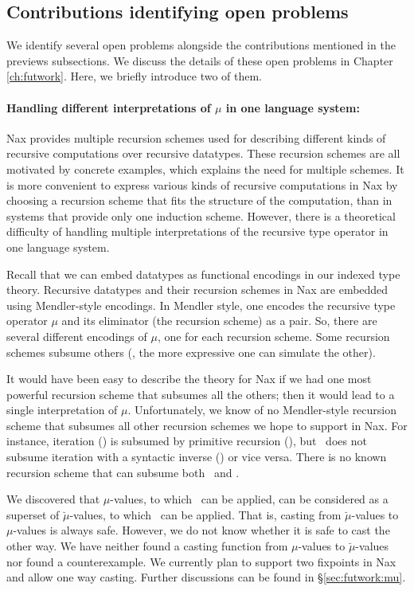 \subsection{Contributions identifying open problems}
We identify several open problems alongside the contributions mentioned
in the previews subsections. We discuss the details of these open problems
in Chapter \ref{ch:futwork}. Here, we briefly introduce two of them.

\paragraph{Handling different interpretations of $\mu$ in one language system:}
Nax provides multiple recursion schemes used for
describing different kinds of recursive computations over recursive datatypes.
These recursion schemes are all motivated by concrete examples, which explains
the need for multiple schemes. It is more convenient to express various kinds of
recursive computations in Nax by choosing a recursion scheme that fits
the structure of the computation, than in systems that provide
only one induction scheme. However, there is a theoretical difficulty
of handling multiple interpretations of the recursive type operator
in one language system.

Recall that we can embed datatypes as functional encodings in
our indexed type theory. Recursive datatypes and their recursion schemes in Nax
are embedded using Mendler-style encodings.
In Mendler style, one encodes the recursive type operator $\mu$
and its eliminator (the recursion scheme) as a pair.
So, there are several different encodings of $\mu$,
one for each recursion scheme. Some recursion schemes subsume others
(\ie, the more expressive one can simulate the other).

It would have been easy to describe the theory for Nax if we had
one most powerful recursion scheme that subsumes all the others;
then it would lead to a single interpretation of $\mu$. Unfortunately,
we know of no Mendler-style recursion scheme that subsumes
all other recursion schemes we hope to support in Nax. For instance,
iteration (\MIt) is subsumed by primitive recursion (\MPr), but \MPr\ does
not subsume iteration with a syntactic inverse (\MsfIt) or vice versa.
There is no known recursion scheme that can subsume both \MsfIt\ and \MPr.

We discovered that $\mu$-values, to which \MIt\ can be applied,
can be considered as a superset of $\breve\mu$-values,
to which \MsfIt\ can be applied. That is, casting from $\breve\mu$-values to
$\mu$-values is always safe. However, we do not know whether it is safe to
cast the other way. We have neither found a casting function from
$\mu$-values to $\breve\mu$-values nor found a counterexample.
We currently plan to support two fixpoints in Nax and allow one way casting.
Further discussions can be found in \S\ref{sec:futwork:mu}.

